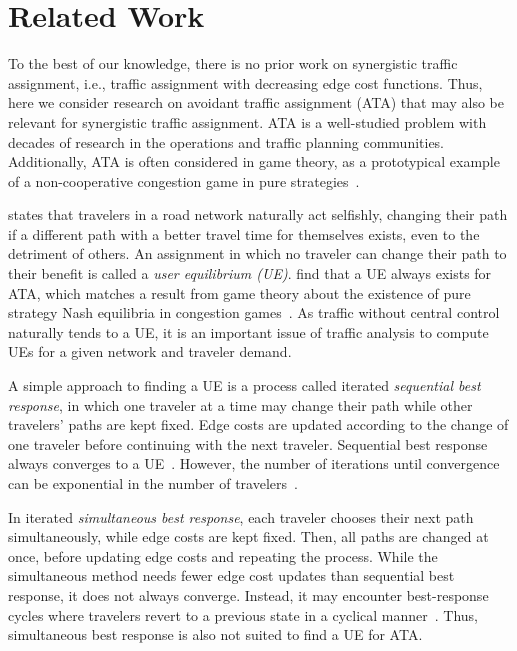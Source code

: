 \section{Related Work}
To the best of our knowledge, there is no prior work on synergistic traffic assignment, i.e., traffic assignment with decreasing edge cost functions.
    Thus, here we consider research on avoidant traffic assignment (ATA) that may also be relevant for synergistic traffic assignment.
    ATA is a well-studied problem with decades of research in the operations and traffic planning communities.
    Additionally, ATA is often considered in game theory, as a prototypical example of a non-cooperative congestion game in pure strategies~\cite{Owen2013,rosenthal1973class}.

    \citet{wardrop1952some} states that travelers in a road network naturally act selfishly, changing their path if a different path with a better travel time for themselves exists, even to the detriment of others.
    An assignment in which no traveler can change their path to their benefit is called a \emph{user equilibrium (UE)}.
    \citet{beckmann1956studies} find that a UE always exists for ATA, which matches a result from game theory about the existence of pure strategy Nash equilibria in congestion games~\cite{rosenthal1973class}.
    As traffic without central control naturally tends to a UE, it is an important issue of traffic analysis to compute UEs for a given network and traveler demand.

    A simple approach to finding a UE is a process called iterated \emph{sequential best response}, in which one traveler at a time may change their path while other travelers' paths are kept fixed.
    Edge costs are updated according to the change of one traveler before continuing with the next traveler.
    Sequential best response always converges to a UE~\cite{rosenthal1973class,Monderer1996}.
    However, the number of iterations until convergence can be exponential in the number of travelers~\cite{Durand2016, Fabrikant2004}.

    In iterated \emph{simultaneous best response}, each traveler chooses their next path simultaneously, while edge costs are kept fixed.
    Then, all paths are changed at once, before updating edge costs and repeating the process.
    While the simultaneous method needs fewer edge cost updates than sequential best response, it does not always converge.
    Instead, it may encounter best-response cycles where travelers revert to a previous state in a cyclical manner~\cite{sheffi1985urban}.
    Thus, simultaneous best response is also not suited to find a UE for ATA.

